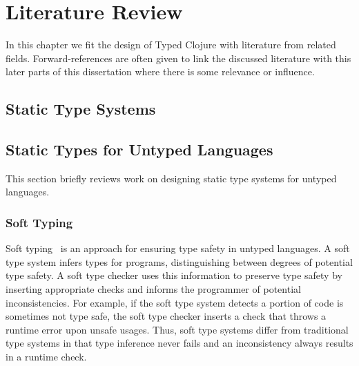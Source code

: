 
\chapter{Literature Review}

In this chapter we fit the design of Typed Clojure with literature from related fields.
Forward-references are often given to link the discussed literature with this later parts
of this dissertation
where there is some relevance or influence.


\section{Static Type Systems}



\section{Static Types for Untyped Languages}

This section briefly reviews work on designing static type systems for untyped languages.

\subsection{Soft Typing}

Soft typing~\cite{CF91}
is an approach for ensuring type safety in untyped languages.
A soft type system infers types for programs, distinguishing between degrees
of potential type safety.
A soft type checker uses this information to 
preserve type safety by inserting appropriate checks 
and informs the programmer of potential inconsistencies.
For example, if the soft type system detects a portion of code is sometimes not type safe,
the soft type checker inserts a check that throws a runtime error upon unsafe usages.
Thus, soft type systems differ from traditional type systems in that type inference 
never fails and an inconsistency always results in a runtime check.

